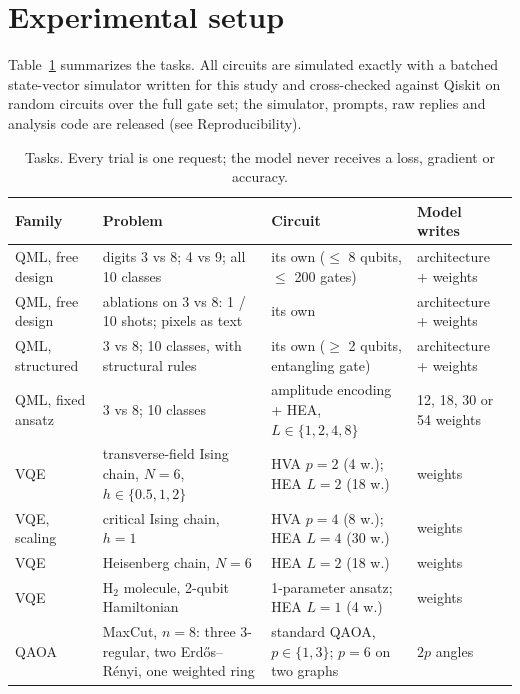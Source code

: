 \section{Experimental setup}
\label{sec:experiments}

Table~\ref{tab:overview} summarizes the tasks. All circuits are simulated exactly with a batched state-vector simulator written for this study and cross-checked against Qiskit on random circuits over the full gate set; the simulator, prompts, raw replies and analysis code are released (see Reproducibility).

\begin{table}[t]
\centering
\small
\begin{tabularx}{\linewidth}{lXXl}
\toprule
Family & Problem & Circuit & Model writes \\
\midrule
QML, free design & digits 3 vs 8; 4 vs 9; all 10 classes & its own (\(\leq\) 8 qubits, \(\leq\) 200 gates) & architecture + weights \\
QML, free design & ablations on 3 vs 8: 1 / 10 shots; pixels as text & its own & architecture + weights \\
QML, structured & 3 vs 8; 10 classes, with structural rules & its own (\(\geq\) 2 qubits, entangling gate) & architecture + weights \\
QML, fixed ansatz & 3 vs 8; 10 classes & amplitude encoding + HEA, \(L \in \{1, 2, 4, 8\}\) & 12, 18, 30 or 54 weights \\
VQE & transverse-field Ising chain, \(N = 6\), \(h \in \{0.5, 1, 2\}\) & HVA \(p = 2\) (4 w.); HEA \(L = 2\) (18 w.) & weights \\
VQE, scaling & critical Ising chain, \(h = 1\) & HVA \(p = 4\) (8 w.); HEA \(L = 4\) (30 w.) & weights \\
VQE & Heisenberg chain, \(N = 6\) & HEA \(L = 2\) (18 w.) & weights \\
VQE & H\(_2\) molecule, 2-qubit Hamiltonian & 1-parameter ansatz; HEA \(L = 1\) (4 w.) & weights \\
QAOA & MaxCut, \(n = 8\): three 3-regular, two Erd\H{o}s--R\'enyi, one weighted ring & standard QAOA, \(p \in \{1, 3\}\); \(p = 6\) on two graphs & \(2p\) angles \\
\bottomrule
\end{tabularx}
\caption{Tasks. Every trial is one request; the model never receives a loss, gradient or accuracy.}
\label{tab:overview}
\end{table}

